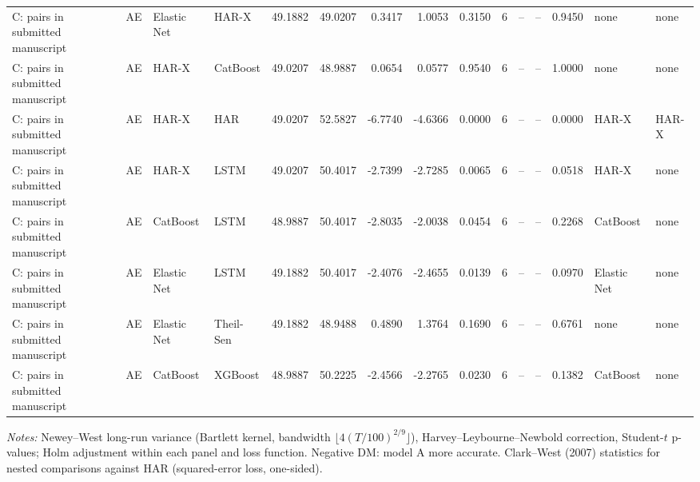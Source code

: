 \begin{table}[htbp]
{\begin{tabular}{llllrrrrrrrrrll}
C: pairs in submitted manuscript & AE & Elastic Net & HAR-X & 49.1882 & 49.0207 & 0.3417 & 1.0053 & 0.3150 & 6 & -- & -- & 0.9450 & none & none \\
C: pairs in submitted manuscript & AE & HAR-X & CatBoost & 49.0207 & 48.9887 & 0.0654 & 0.0577 & 0.9540 & 6 & -- & -- & 1.0000 & none & none \\
C: pairs in submitted manuscript & AE & HAR-X & HAR & 49.0207 & 52.5827 & -6.7740 & -4.6366 & 0.0000 & 6 & -- & -- & 0.0000 & HAR-X & HAR-X \\
C: pairs in submitted manuscript & AE & HAR-X & LSTM & 49.0207 & 50.4017 & -2.7399 & -2.7285 & 0.0065 & 6 & -- & -- & 0.0518 & HAR-X & none \\
C: pairs in submitted manuscript & AE & CatBoost & LSTM & 48.9887 & 50.4017 & -2.8035 & -2.0038 & 0.0454 & 6 & -- & -- & 0.2268 & CatBoost & none \\
C: pairs in submitted manuscript & AE & Elastic Net & LSTM & 49.1882 & 50.4017 & -2.4076 & -2.4655 & 0.0139 & 6 & -- & -- & 0.0970 & Elastic Net & none \\
C: pairs in submitted manuscript & AE & Elastic Net & Theil-Sen & 49.1882 & 48.9488 & 0.4890 & 1.3764 & 0.1690 & 6 & -- & -- & 0.6761 & none & none \\
C: pairs in submitted manuscript & AE & CatBoost & XGBoost & 48.9887 & 50.2225 & -2.4566 & -2.2765 & 0.0230 & 6 & -- & -- & 0.1382 & CatBoost & none \\
\bottomrule
\end{tabular}%
}
\par\vspace{2pt}\footnotesize\textit{Notes:} Newey--West long-run variance (Bartlett kernel, bandwidth $\lfloor 4(T/100)^{2/9} \rfloor$), Harvey--Leybourne--Newbold correction, Student-$t$ p-values; Holm adjustment within each panel and loss function. Negative DM: model A more accurate. Clark--West (2007) statistics for nested comparisons against HAR (squared-error loss, one-sided).
\end{table}

